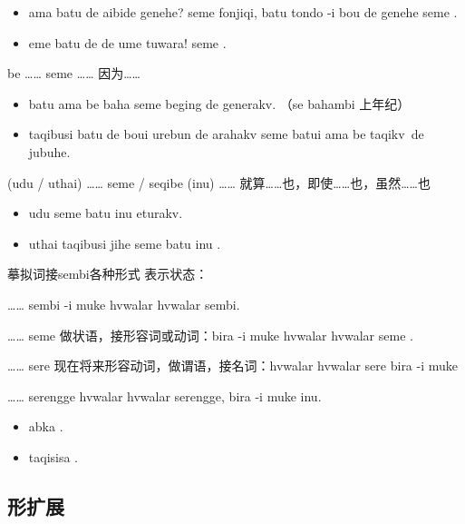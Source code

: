 \begin{des}
\begin{itemize}
            \item ama batu de aibide genehe? seme fonjiqi, batu tondo -i bou de  genehe seme .
            \item eme batu de  de ume tuwara! seme .
        \end{itemize}
    \item[\A be …… seme ……] 因为\A ……
        \begin{itemize}
            \item batu ama be  baha seme beging de generakv. （se bahambi 上年纪）
            \item taqibusi batu de boui urebun de arahakv seme batui ama be taqikv~de jubuhe.
        \end{itemize}
    \item[(udu / uthai) …… seme / seqibe (inu) ……] 就算……也，即使……也，虽然……也
        \begin{itemize}
            \item udu  seme batu inu   eturakv.
            \item uthai taqibusi jihe seme batu inu .
        \end{itemize}
    \item[摹拟词接sembi各种形式] 表示状态：
        \begin{des}
            \item[…… sembi]  -i muke hvwalar hvwalar sembi.
            \item[…… seme] 做状语，接形容词或动词：bira -i muke hvwalar hvwalar seme .
            \item[…… sere] 现在将来形容动词，做谓语，接名词：hvwalar hvwalar sere bira -i muke
            \item[…… serengge] hvwalar hvwalar serengge, bira -i muke inu.
        \end{des}
        \begin{itemize}
            \item abka  .
            \item {} taqisisa .
        \end{itemize}
\end{des}

\subsection{形扩展}

